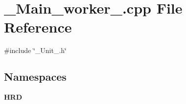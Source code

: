 \section{\+\_\+\+Main\+\_\+worker\+\_\+.\+cpp File Reference}
\label{___main__worker___8cpp}
{\ttfamily \#include \char`\"{}\+\_\+\+Unit\+\_\+.\+h\char`\"{}}\newline
\subsection*{Namespaces}
\begin{DoxyCompactItemize}
\item 
 \textbf{ H\+RD}
\end{DoxyCompactItemize}
